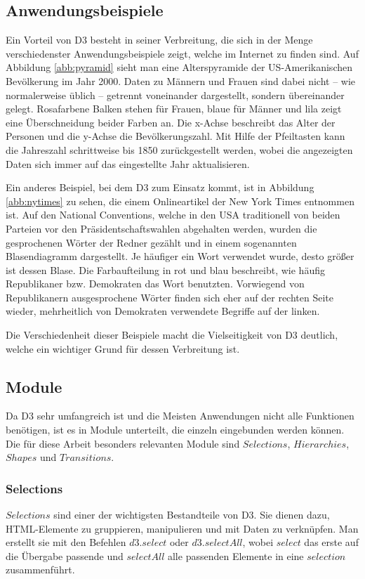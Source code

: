 \subsection{Anwendungsbeispiele}\label{sec:anwendung}
Ein Vorteil von D3 besteht in seiner Verbreitung, die sich in der Menge verschiedenster Anwendungsbeispiele zeigt, welche im Internet zu finden sind. Auf Abbildung \ref{abb:pyramid} sieht man eine Alterspyramide der US-Amerikanischen Bevölkerung im Jahr 2000.  Daten zu Männern und Frauen sind dabei nicht -- wie normalerweise üblich -- getrennt voneinander dargestellt, sondern übereinander gelegt. Rosafarbene Balken stehen für Frauen, blaue für Männer und lila zeigt eine Überschneidung beider Farben an. Die x-Achse beschreibt das Alter der Personen und die y-Achse die Bevölkerungszahl. Mit Hilfe der Pfeiltasten kann die Jahreszahl schrittweise bis 1850 zurückgestellt werden, wobei die angezeigten Daten sich immer auf das eingestellte Jahr aktualisieren.

Ein anderes Beispiel, bei dem D3 zum Einsatz kommt, ist in Abbildung \ref{abb:nytimes} zu sehen, die einem Onlineartikel der New York Times entnommen ist.  Auf den \glqq National Conventions\grqq, welche in den USA traditionell von beiden Parteien vor den Präsidentschaftswahlen abgehalten werden, wurden die gesprochenen Wörter der Redner gezählt und in einem sogenannten Blasendiagramm dargestellt. Je häufiger ein Wort verwendet wurde, desto größer ist dessen Blase. Die Farbaufteilung in rot und blau beschreibt, wie häufig Republikaner bzw. Demokraten das Wort benutzten. Vorwiegend von Republikanern ausgesprochene Wörter finden sich eher auf der rechten Seite wieder, mehrheitlich von Demokraten verwendete Begriffe auf der linken.

Die Verschiedenheit dieser Beispiele macht die Vielseitigkeit von D3 deutlich, welche ein wichtiger Grund für dessen Verbreitung ist.

\subsection{Module}
Da D3 sehr umfangreich ist und die Meisten Anwendungen nicht alle Funktionen benötigen, ist es in Module unterteilt, die einzeln eingebunden werden können. Die für diese Arbeit besonders relevanten Module sind $Selections$, $Hierarchies$, $Shapes$ und $Transitions$.

\subsubsection*{Selections}\label{sec:selections}
$Selections$ sind einer der wichtigsten Bestandteile von D3. Sie dienen dazu, HTML-Elemente zu gruppieren, manipulieren und mit Daten zu verknüpfen. Man erstellt sie mit den Befehlen $d3.select$ oder $d3.selectAll$, wobei $select$ das erste auf die Übergabe passende und $selectAll$ alle passenden Elemente in eine $selection$ zusammenführt.  

